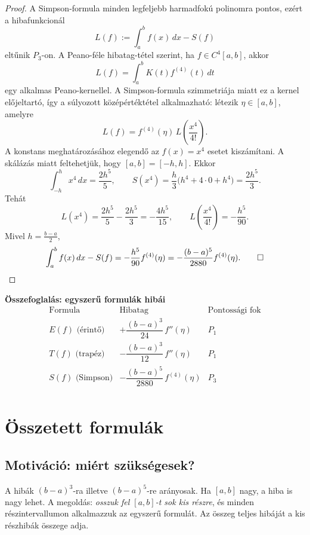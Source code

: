 \documentclass[a4paper,12pt]{article}
\theoremstyle{mydef}
\begin{document}
\begin{proof}
A Simpson-formula minden legfeljebb harmadfokú polinomra pontos, ezért a hibafunkcionál
\[
  L(f):=\int_a^b f(x)\,dx-S(f)
\]
eltűnik $P_3$-on. A Peano-féle hibatag-tétel szerint, ha $f\in C^4[a,b]$, akkor
\[
  L(f)=\int_a^b K(t)f^{(4)}(t)\,dt
\]
egy alkalmas Peano-kernellel. A Simpson-formula szimmetriája miatt ez a kernel előjeltartó,
így a súlyozott középértéktétel alkalmazható: létezik $\eta\in[a,b]$, amelyre
\[
  L(f)=f^{(4)}(\eta)\,L\!\left(\frac{x^4}{4!}\right).
\]
A konstans meghatározásához elegendő az $f(x)=x^4$ esetet kiszámítani. A skálázás miatt
feltehetjük, hogy $[a,b]=[-h,h]$. Ekkor
\[
  \int_{-h}^{h} x^4\,dx=\frac{2h^5}{5},
  \qquad
  S(x^4)=\frac{h}{3}\bigl(h^4+4\cdot 0+h^4\bigr)=\frac{2h^5}{3}.
\]
Tehát
\[
  L(x^4)=\frac{2h^5}{5}-\frac{2h^5}{3}=-\frac{4h^5}{15},
  \qquad
  L\!\left(\frac{x^4}{4!}\right)=-\frac{h^5}{90}.
\]
Mivel $h=\tfrac{b-a}{2}$,
\[
  \int_a^b f(x)\,dx-S(f)
  =-\frac{h^5}{90}f^{(4)}(\eta)
  =-\frac{(b-a)^5}{2880}f^{(4)}(\eta). \qed
\]
\end{proof}

\begin{mdframed}[backgroundcolor=exbg,linewidth=0pt,innertopmargin=6pt,innerbottommargin=6pt]
\textbf{Összefoglalás: egyszerű formulák hibái}
\[
\renewcommand{\arraystretch}{1.5}
\begin{array}{l|c|c}
\text{Formula} & \text{Hibatag} & \text{Pontossági fok}\\
\hline
E(f)\text{ (érintő)} & +\dfrac{(b-a)^3}{24}\,f''(\eta) & P_1 \\
T(f)\text{ (trapéz)} & -\dfrac{(b-a)^3}{12}\,f''(\eta) & P_1 \\
S(f)\text{ (Simpson)} & -\dfrac{(b-a)^5}{2880}\,f^{(4)}(\eta) & P_3 \\
\end{array}
\]
\end{mdframed}

\section{Összetett formulák}
\label{sec:osszetett}

\subsection*{Motiváció: miért szükségesek?}

A hibák $(b-a)^3$-ra illetve $(b-a)^5$-re arányosak. Ha $[a,b]$ nagy, a hiba
is nagy lehet. A megoldás: \emph{osszuk fel $[a,b]$-t sok kis részre}, és minden
részintervallumon alkalmazzuk az egyszerű formulát. Az összeg teljes hibáját
a kis részhibák összege adja.
\end{document}
